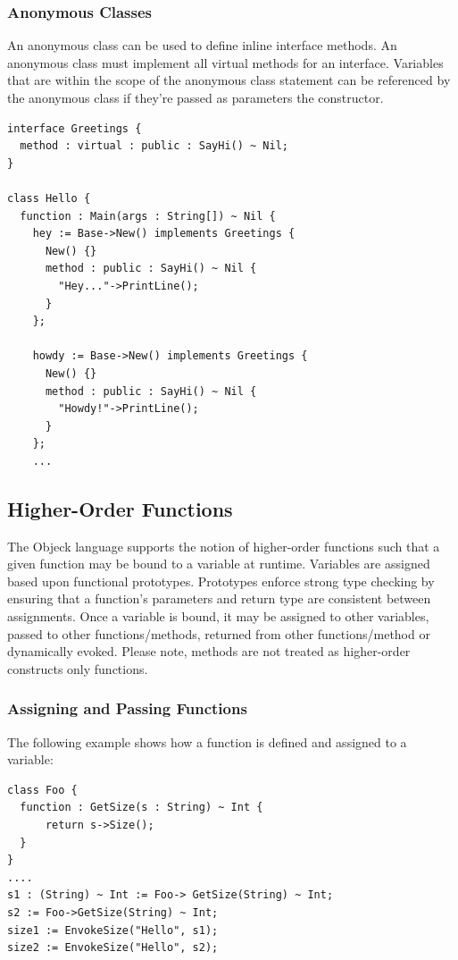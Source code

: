 \documentclass[11pt]{article}
\begin{document}
\subsubsection{Anonymous Classes}
An anonymous class can be used to define inline interface methods.  An anonymous class must implement all virtual methods for an interface.  Variables that are within the scope of the anonymous class statement can be referenced by the anonymous class if they're passed as parameters the constructor.

\begin{verbatim}
interface Greetings {
  method : virtual : public : SayHi() ~ Nil;
}

class Hello {
  function : Main(args : String[]) ~ Nil {
    hey := Base->New() implements Greetings {
      New() {}
      method : public : SayHi() ~ Nil {
        "Hey..."->PrintLine();
      }
    };

    howdy := Base->New() implements Greetings {
      New() {}
      method : public : SayHi() ~ Nil {
        "Howdy!"->PrintLine();
      }
    };
    ...

\end{verbatim}

\subsection{Higher-Order Functions}
The Objeck language supports the notion of higher-order functions such
that a given function may be bound to a variable at runtime.
Variables are assigned based upon functional prototypes.  Prototypes
enforce strong type checking by ensuring that a function's parameters
and return type are consistent between assignments.  Once a variable
is bound, it may be assigned to other variables, passed to other
functions/methods, returned from other functions/method or dynamically
evoked.  Please note, methods are not treated as higher-order
constructs only functions.

\subsubsection{Assigning and Passing Functions}
The following example shows how a function is defined and assigned to
a variable:
\begin{verbatim}
class Foo {
  function : GetSize(s : String) ~ Int {
      return s->Size();
  }
}
....
s1 : (String) ~ Int := Foo-> GetSize(String) ~ Int;
s2 := Foo->GetSize(String) ~ Int;
size1 := EnvokeSize("Hello", s1);
size2 := EnvokeSize("Hello", s2);
\end{verbatim}
\end{document}
